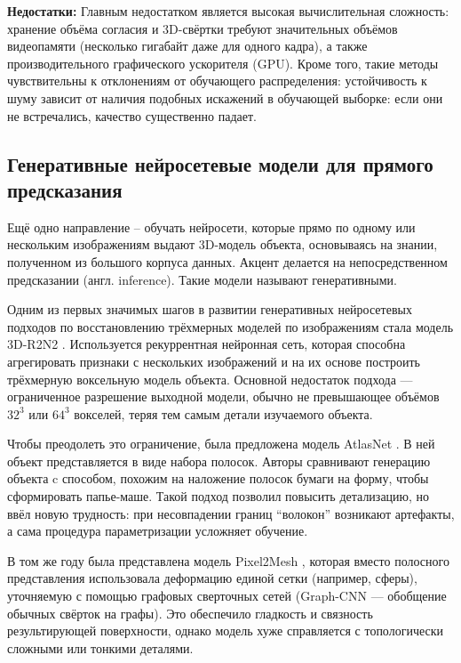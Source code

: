 \textbf{Недостатки:}
Главным недостатком является высокая вычислительная сложность: хранение объёма
согласия и 3D-свёртки требуют значительных объёмов видеопамяти (несколько
гигабайт даже для одного кадра), а также производительного графического
ускорителя (GPU). Кроме того, такие методы чувствительны к отклонениям от
обучающего распределения: устойчивость к шуму зависит от наличия подобных
искажений в обучающей выборке: если они не встречались, качество существенно
падает.

\subsection{Генеративные нейросетевые модели для прямого предсказания}

Ещё одно направление – обучать нейросети, которые прямо по одному или нескольким
изображениям выдают 3D-модель объекта, основываясь на знании, полученном из
большого корпуса данных. Акцент делается на непосредственном предсказании (англ.
inference). Такие модели называют генеративными.

Одним из первых значимых шагов в развитии генеративных нейросетевых подходов по
восстановлению трёхмерных моделей по изображениям стала модель 3D-R2N2
\cite{choy20163dr2n2unifiedapproachsingle}. Используется рекуррентная
нейронная сеть, которая способна агрегировать признаки с нескольких изображений
и на их основе построить трёхмерную воксельную модель объекта. Основной
недостаток подхода — ограниченное разрешение выходной модели, обычно не
превышающее объёмов \(32^3\) или \(64^3\) вокселей, теряя тем самым детали
изучаемого объекта.

Чтобы преодолеть это ограничение, была предложена модель AtlasNet
\cite{groueix2018atlasnetpapiermacheapproachlearning}. В ней объект
представляется в виде набора полосок. Авторы сравнивают генерацию объекта c
способом, похожим на наложение полосок бумаги на форму, чтобы сформировать
папье-маше. Такой подход позволил повысить детализацию, но ввёл новую
трудность: при несовпадении границ ``волокон'' возникают артефакты, а сама процедура
параметризации усложняет обучение.

В том же году была представлена модель Pixel2Mesh
\cite{wang2018pixel2meshgenerating3dmesh}, которая вместо полосного
представления использовала деформацию единой сетки (например, сферы), уточняемую
с помощью графовых сверточных сетей (Graph-CNN — обобщение обычных свёрток на
графы). Это обеспечило гладкость и связность результирующей поверхности, однако
модель хуже справляется с топологически сложными или тонкими деталями.

